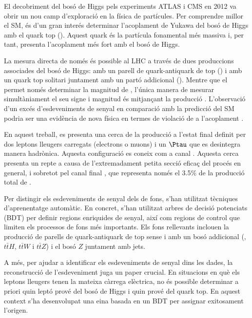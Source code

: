 El decobriment del bosó de Higgs pels experiments ATLAS \cite{20121_ATLAS_HiggsDiscovery} 
i CMS \cite{201230_CMS_HiggsDiscovery} en 2012 va obrir un nou camp d'exploració en la física 
de partícules. Per comprendre millor el SM, és d'un gran interés determinar l'acoplament de Yukawa 
del bosó de Higgs amb el quark $\text{top}$ (\yt). Aquest quark és la partícula fonamental més massiva 
i, per tant, presenta l'acoplament més fort amb el bosó de Higgs.

La mesura directa de \yt només és possible al LHC a través de dues produccions associades 
del bosó de Higgs: amb un parell de quark-antiquark de $\text{top}$ (\ttH) i amb un quark $\text{top}$ 
solitari juntament amb un partó addicional (\tHq). Mentre que el \ttH permet només determinar la 
magnitud de \yt, l'única manera de mesurar simultàniament el seu signe i magnitud és mitjançant la
 producció \tH \cite{Demartin:2015uha}. L'observació d'un excés d'esdeveniments de senyal en 
 comparació amb la predicció del SM podria ser una evidència de nova física en termes de violació 
 de \CP a l'acoplament \yt.
 
 En aquest treball, es presenta una cerca de la producció \tHq a l'estat final definit 
per dos leptons lleugers carregats (electrons o muons) i un $\Ptau$ que es desintegra 
manera hadrònica. Aquesta configuració es coneix com a canal \dileptau.
Aquesta cerca presenta un repte a causa de l'extremadament petita secció eficaç del procés \tHq en general,
i sobretot pel canal final \dileptau, que representa només el 3.5\% de la producció total de \tHq.

Per distingir els esdeveniments de senyal \tHq dels de fons, s'han utilitzat tècniques d'aprenentatge automàtic. 
En concret, s'han utilitzat arbres de decisió potenciats (BDT) per definir regions enriquides de senyal, així com regions 
de control que limiten els processos de fons més importants. Els fons rellevants inclouen la producció de parells 
de quark-antiquark de $\text{top}$ sense i amb un bosó addicional (\ttbar, $t\bar{t}H$, $t\bar{t}W$ i $t\bar{t}Z$) i 
el bosó $Z$ juntament amb jets.


A més, per ajudar a identificar els esdeveniments de senyal dins les dades, la reconstrucció de l'esdeveniment juga 
un paper crucial. En situacions en què els leptons lleugers tenen la mateixa càrrega elèctrica, no és possible 
determinar a priori quin leptó prové del bosó de Higgs i quin prové del quark $\text{top}$. En aquest context s'ha 
desenvolupat una eina basada en un BDT per assignar exitosament l'origen. 

